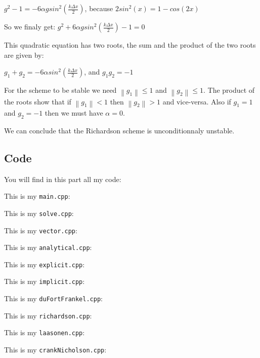 \documentclass [10 pt, a4 paper]{article}
\begin{document}
$g^{2} - 1 = -6\alpha g sin^{2}(\frac{k\Delta x}{2})$, because $ 2sin^{2}(x) = 1 - cos(2x)$

So we finaly get: 
$g^{2} + 6\alpha g sin^{2}(\frac{k\Delta x}{2}) - 1 = 0$

This quadratic equation has two roots, the sum and the product of the two roots are given by:

$g_{1} + g_{2} = - 6 \alpha sin^{2}(\frac{k\Delta x}{2})$, and $g_{1} g_{2} = -1$

For the scheme to be stable we need $\left \|  g_{1} \right \| \leq 1$ and $\left \|  g_{2} \right \| \leq 1$.
The product of the roots show that if $\left \|  g_{1} \right \| < 1$ then $\left \|  g_{2} \right \| > 1$
and vice-versa. Also if $g_{1} = 1$ and $g_{2} = -1$ then we must have $\alpha = 0$.

We can conclude that the Richardson scheme is unconditionnaly unstable.

\subsection{Code}
You will find in this part all my code:


 
This is my \texttt{main.cpp}:


This is my \texttt{solve.cpp}:


This is my \texttt{vector.cpp}:


This is my \texttt{analytical.cpp}:


This is my \texttt{explicit.cpp}:


This is my \texttt{implicit.cpp}:


This is my \texttt{duFortFrankel.cpp}:


This is my \texttt{richardson.cpp}:


This is my \texttt{laasonen.cpp}:


This is my \texttt{crankNicholson.cpp}:

\end{document}
